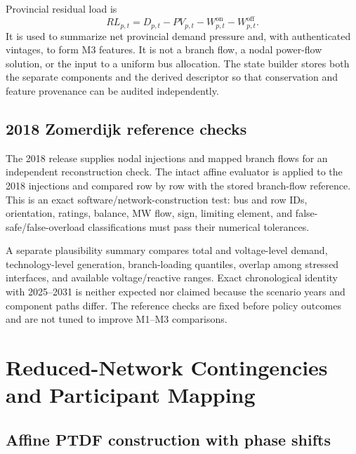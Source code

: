 \documentclass[10pt,journal,onecolumn]{IEEEtran}
\begin{document}
Provincial residual load is
\begin{equation}
RL_{p,t}
=D_{p,t}-PV_{p,t}-W_{p,t}^{\mathrm{on}}-W_{p,t}^{\mathrm{off}}.
\end{equation}
It is used to summarize net provincial demand pressure and, with authenticated
vintages, to form M3 features. It is not a branch flow, a nodal power-flow
solution, or the input to a uniform bus allocation. The state builder stores
both the separate components and the derived descriptor so that conservation
and feature provenance can be audited independently.

\subsection{2018 Zomerdijk reference checks}

The 2018 release supplies nodal injections and mapped branch flows for an
independent reconstruction check. The intact affine evaluator is applied to the
2018 injections and compared row by row with the stored branch-flow reference.
This is an exact software/network-construction test: bus and row IDs, orientation,
ratings, balance, MW flow, sign, limiting element, and false-safe/false-overload
classifications must pass their numerical tolerances.

A separate plausibility summary compares total and voltage-level demand,
technology-level generation, branch-loading quantiles, overlap among stressed
interfaces, and available voltage/reactive ranges. Exact chronological identity
with 2025--2031 is neither expected nor claimed because the scenario years and
component paths differ. The reference checks are fixed before policy outcomes
and are not tuned to improve M1--M3 comparisons.

\section{Reduced-Network Contingencies and Participant Mapping}
\label{sec:report_network_mapping}

\subsection{Affine PTDF construction with phase shifts}
\end{document}
